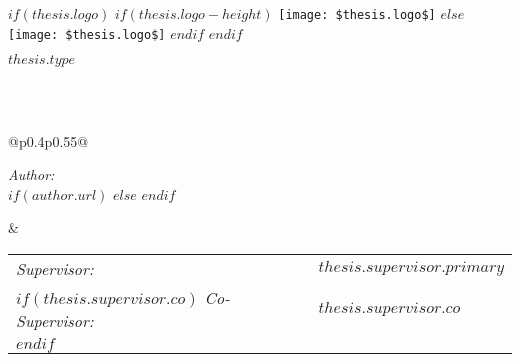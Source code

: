 \frontmatter %

\pagestyle{plain} %


\begin{titlepage}
\begin{center}

$if(thesis.logo)$
$if(thesis.logo-height)$
\texttt{[image: \$thesis.logo\$]} %
$else$
\texttt{[image: \$thesis.logo\$]} %
$endif$
$endif$

\vspace*{.06\textheight}
{\scshape\LARGE \univname\par}\vspace{1.5cm} %
\textsc{\Large $thesis.type$}\\[0.5cm] %

\HRule \\[0.4cm] %
{\LARGE \bfseries \ttitle\par}\vspace{0.4cm} %
\HRule \\[1.5cm] %

\begin{tabular}{@{}p{}p{}@{}}
\begin{flushleft} \large
\emph{Author:}\\
$if(author.url)$
\href{$author.url$}{\textbf{\authorname}} %
$else$
\textbf{\authorname}
$endif$
\end{flushleft}
&
\begin{flushright} \large
\begin{tabular}{@{}ll@{}}
\emph{Supervisor:} & \textbf{$thesis.supervisor.primary$} \\
$if(thesis.supervisor.co)$
\emph{Co-Supervisor:} & \textbf{$thesis.supervisor.co$} \\
$endif$
\end{tabular}
\end{flushright}
\end{tabular}\\[3cm]  


\end{center}
\end{titlepage}
